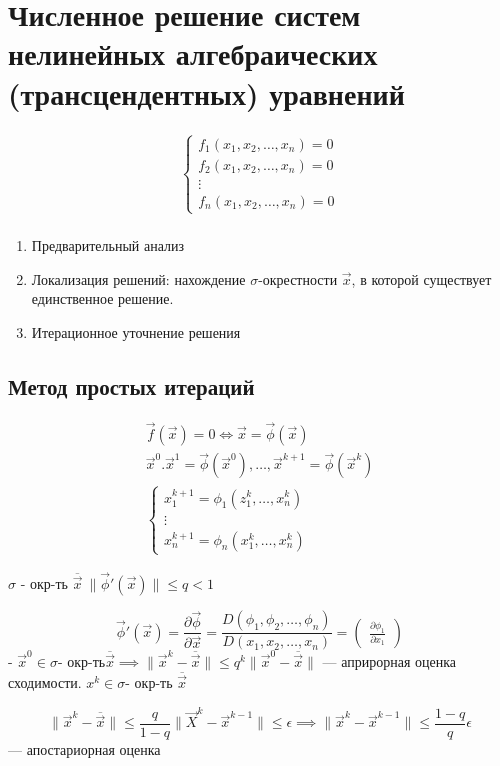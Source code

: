 \section{Численное решение систем нелинейных алгебраических (трансцендентных)
  уравнений}

\begin{gather*}
  \begin{cases}
    f_1(x_1, x_2, \dotsc, x_n) = 0\\
    f_2(x_1, x_2, \dotsc, x_n) = 0\\
    \vdots\\
    f_n(x_1, x_2, \dotsc, x_n) = 0
  \end{cases} \\
\end{gather*}

\begin{enumerate}
\item Предварительный анализ
\item Локализация решений: нахождение $\sigma$-окрестности $\vec{x}$, в которой
  существует единственное решение.
\item Итерационное уточнение решения
\end{enumerate}

\subsection{Метод простых итераций}
\begin{gather*}
  \vec{f}(\vec{x}) = 0 \iff \vec{x} = \vec{\phi}(\vec{x}) \\
  \vec{x}^0. \vec{x}^1 = \vec{\phi}(\vec{x}^0),\dotsc, \vec{x}^{k + 1} =
  \vec{\phi}(\vec{x}^k) \\
  \begin{cases}
    x_1^{k + 1} = \phi_1(z_1^k, \dotsc, x_n^k) \\
    \vdots\\
    x_n^{k + 1} = \phi_n(x_1^k, \dotsc, x_n^k)
  \end{cases}
\end{gather*}

$\sigma$ - окр-ть $\overline{\vec{x}}\ \|\vec{\phi}'(\vec{x})\| \leq q < 1$

\[
  \vec{\phi}'(\vec{x}) = \frac{\partial \vec{\phi}}{\partial \vec{x}} =
  \frac{D(\phi_1, \phi_2, \dotsc, \phi_n)}{D(x_1, x_2, \dotsc, x_n)} =
  \begin{pmatrix}
    \frac{\partial \phi_1}{\partial x_1}
  \end{pmatrix}
\] - $\vec{x}^0 \in \sigma\text{- окр-ть} \overline{\vec{x}} \implies
\|\vec{x}^k - \overline{\vec{x}}\| \leq q^k \|\vec{x}^0 - \overline{\vec{x}}\|$
--- априрорная оценка сходимости.
$x^k \in \sigma\text{- окр-ть } \overline{\vec{x}}$

\[
  \|\vec{x}^k - \overline{\vec{x}}\| \leq \frac{q}{1 - q} \|\vec{X}^k -
  \vec{x}^{k - 1}\| \leq \epsilon \implies \|\vec{x}^k - \vec{x}^{k - 1}\| \leq
  \frac{1 - q}{q} \epsilon
\] --- апостариорная оценка